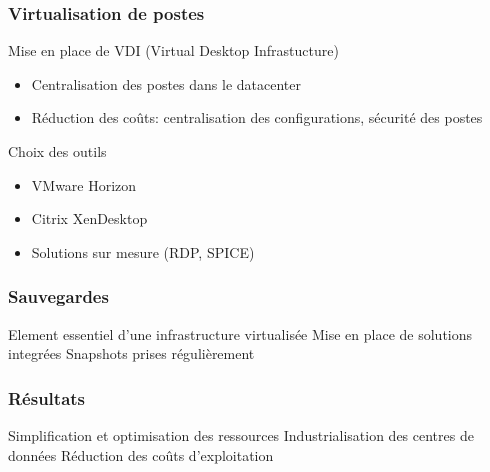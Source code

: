 \documentclass{beamer}
\begin{document}

\begin{frame}
\frametitle{Virtualisation de postes}

Mise en place de VDI (Virtual Desktop Infrastucture)

\begin{itemize}
    \item Centralisation des postes dans le datacenter
    \item Réduction des coûts: centralisation des configurations, sécurité des postes
\end{itemize}

Choix des outils
\begin{itemize}
    \item VMware Horizon
    \item Citrix XenDesktop
    \item Solutions sur mesure (RDP, SPICE)
\end{itemize}


\end{frame}


\begin{frame}
\frametitle{Sauvegardes}
Element essentiel d'une infrastructure virtualisée
\medbreak
\medbreak
Mise en place de solutions integrées
\medbreak
\medbreak
Snapshots prises régulièrement

\end{frame}


\begin{frame}
\frametitle{Résultats}

Simplification et optimisation des ressources
\medbreak
\medbreak
Industrialisation des centres de données
\medbreak
\medbreak
Réduction des coûts d'exploitation

\end{frame}


\end{document}
